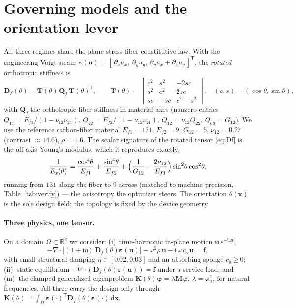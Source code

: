 \documentclass[preprint,11pt]{elsarticle}
\newcommand{\vu}{\mathbf{u}}
\newcommand{\vx}{\mathbf{x}}
\newcommand{\vf}{\mathbf{f}}
\newcommand{\vphi}{\bm{\varphi}}
\newcommand{\veps}{\bm{\varepsilon}}
\newcommand{\Tp}{^{\mathsf{T}}}
\newcommand{\ii}{\mathrm{i}}
\newcommand{\rmd}{\mathrm{d}}
\newcommand{\Df}{\mathbf{D}_f}
\newcommand{\Qf}{\mathbf{Q}_f}
\newcommand{\Tm}{\mathbf{T}}
\newcommand{\Kmat}{\mathbf{K}}
\newcommand{\Mmat}{\mathbf{M}}
\theoremstyle{plain}\newtheorem{proposition}{Proposition}
\theoremstyle{remark}\newtheorem{remark}{Remark}
\begin{document}
\section{Governing models and the orientation lever}
\label{sec:model}
All three regimes share the plane-stress fiber constitutive law. With the engineering
Voigt strain $\veps(\vu)=[\,\partial_x u_x,\ \partial_y u_y,\ \partial_y u_x+\partial_x
u_y\,]\Tp$, the \emph{rotated} orthotropic stiffness is
\begin{equation}
  \Df(\theta)=\Tm(\theta)\,\Qf\,\Tm(\theta)\Tp,\qquad
  \Tm(\theta)=\begin{bmatrix} c^2 & s^2 & -2sc\\ s^2 & c^2 & 2sc\\
  sc & -sc & c^2-s^2\end{bmatrix},\quad (c,s)=(\cos\theta,\sin\theta),
  \label{eq:Df}
\end{equation}
with $\Qf$ the orthotropic fiber stiffness in material axes (nonzero entries
$Q_{11}=E_{f1}/(1{-}\nu_{12}\nu_{21})$, $Q_{22}=E_{f2}/(1{-}\nu_{12}\nu_{21})$,
$Q_{12}=\nu_{12}Q_{22}$, $Q_{66}=G_{12}$). We use the reference carbon-fiber material
$E_{f1}=131$, $E_{f2}=9$, $G_{12}=5$, $\nu_{12}=0.27$ (contrast $\approx14.6$),
$\rho=1.6$. The scalar signature of the rotated tensor \eqref{eq:Df} is the off-axis
Young's modulus, which it reproduces exactly,
\begin{equation}
  \frac{1}{E_x(\theta)}=\frac{\cos^4\!\theta}{E_{f1}}+\frac{\sin^4\!\theta}{E_{f2}}
  +\Bigl(\frac{1}{G_{12}}-\frac{2\nu_{12}}{E_{f1}}\Bigr)\sin^2\!\theta\cos^2\!\theta ,
  \label{eq:Ex}
\end{equation}
running from $131$ along the fiber to $9$ across (matched to machine precision,
Table~\ref{tab:verify}) --- the anisotropy the optimizer steers. The orientation
$\theta(\vx)$ is the sole design field; the topology is fixed by the device geometry.

\paragraph{Three physics, one tensor.} On a domain $\Omega\subset\mathbb R^2$ we consider:
(i)~time-harmonic in-plane motion $\vu\,e^{-\ii\omega t}$,
\begin{equation}
  -\nabla\!\cdot\!\bigl[(1+\ii\eta)\,\Df(\theta)\veps(\vu)\bigr]
  -\omega^2\rho\,\vu-\ii\,\omega\,c_{\mathrm s}\,\vu=\vf,
  \label{eq:harm}
\end{equation}
with small structural damping $\eta\in[0.02,0.03]$ and an absorbing sponge $c_{\mathrm s}
\ge0$; (ii)~static equilibrium $-\nabla\!\cdot\!(\Df(\theta)\veps(\vu))=\vf$ under a
service load; and (iii)~the clamped generalized eigenproblem $\Kmat(\theta)\vphi=\lambda
\Mmat\vphi$, $\lambda=\omega_n^2$, for natural frequencies. All three carry the design
only through $\Kmat(\theta)=\int_\Omega\veps(\cdot)\Tp\Df(\theta)\veps(\cdot)\,\rmd\vx$.
\end{document}
